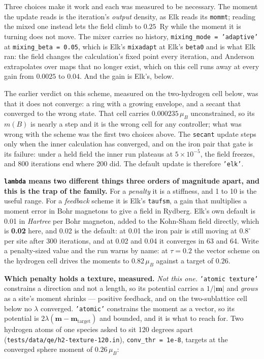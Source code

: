\documentclass[11pt,a4paper]{article}
\newcommand{\code}[1]{\texttt{\small #1}}
\begin{document}
Three choices make it work and each was measured to be necessary. The moment the
update reads is the iteration's \emph{output} density, as Elk reads its
\code{mommt}; reading the mixed one instead lets the field climb to $0.25$~Ry
while the moment it is turning does not move. The mixer carries no history,
\code{mixing\_mode = 'adaptive'} at \code{mixing\_beta = 0.05}, which is Elk's
\code{mixadapt} at Elk's \code{beta0} and is what Elk ran: the field changes the
calculation's fixed point every iteration, and Anderson extrapolates over maps
that no longer exist, which on this cell runs away at every gain from $0.0025$ to
$0.04$. And the gain is Elk's, below.

The earlier verdict on this scheme, measured on the two-hydrogen cell below, was
that it does not converge: a ring with a growing envelope, and a secant that
converged to the wrong state. That cell carries $0.000235\,\mu_B$ unconstrained,
so its $m(B)$ is nearly a step and it is the wrong cell for any controller; what
was wrong with the scheme was the first two choices above. The \code{secant}
update steps only when the inner calculation has converged, and on the iron pair
that gate is its failure: under a held field the inner run plateaus at
$5\times10^{-5}$, the field freezes, and 800 iterations end where 200 did. The
default update is therefore \code{'elk'}.

\textbf{\code{lambda} means two different things three orders of magnitude
apart, and this is the trap of the family.} For a \emph{penalty} it is a
stiffness, and 1 to 10 is the useful range. For a \emph{feedback} scheme it is
Elk's \code{taufsm}, a gain that multiplies a moment error in Bohr magnetons to
give a field in Rydberg. Elk's own default is 0.01 in \emph{Hartree} per Bohr
magneton, added to the Kohn-Sham field directly, which is \textbf{0.02} here, and
0.02 is the default: at 0.01 the iron pair is still moving at $0.8^\circ$ per site
after 300 iterations, and at 0.02 and 0.04 it converges in 63 and 64. Write a
penalty-sized value and the run warns by name: at $\tau = 0.2$ the vector scheme
on the hydrogen cell drives the moments to $0.82\,\mu_B$ against a target of
$0.26$.

\textbf{Which penalty holds a texture, measured.} \emph{Not this one.}
\code{'atomic texture'} constrains a direction and not a length, so its
potential carries a $1/|\mathbf m|$ and \emph{grows} as a site's moment
shrinks --- positive feedback, and on the two-sublattice cell below no
$\lambda$ converged. \code{'atomic'} constrains the moment as a vector, so its
potential is $2\lambda(\mathbf m - \mathbf m_{\mathrm{target}})$ and bounded,
and it is what to reach for. Two hydrogen atoms of one species asked to sit 120
degrees apart (\code{tests/data/qe/h2-texture-120.in}), \code{conv\_thr = 1e-8},
targets at the converged sphere moment of $0.26\,\mu_B$:
\end{document}
